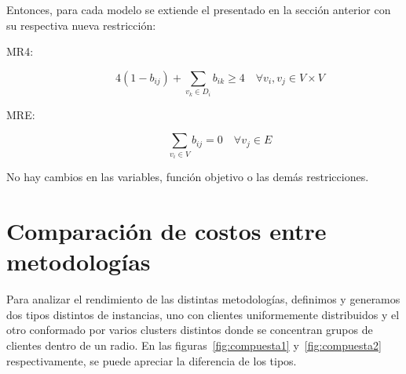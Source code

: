 \documentclass[10pt]{article}
\begin{document}
	Entonces, para cada modelo se extiende el presentado en la sección anterior con su respectiva nueva restricción:
	
	\begin{description}
		\item[MR4:]
		\[
		4(1 - b_{ij}) + \sum_{v_k \in D_i} b_{ik} \geq 4 \quad \forall v_i, v_j \in V \times V
		\]
		
		\item[MRE:]
		\[
		\sum_{v_i \in V}  b_{ij} = 0 \quad \forall v_j \in E
		\]
	\end{description}
	
	No hay cambios en las variables, función objetivo o las demás restricciones.

\clearpage

\section{Comparación de costos entre metodologías}
Para analizar el rendimiento de las distintas metodologías, definimos y generamos dos tipos distintos de instancias, uno con clientes uniformemente distribuidos y el otro conformado por varios clusters distintos donde se concentran grupos de clientes dentro de un radio. En las figuras~\ref{fig:compuesta1} y~\ref{fig:compuesta2} respectivamente, se puede apreciar la diferencia de los tipos.

\vspace{5mm}
\end{document}
